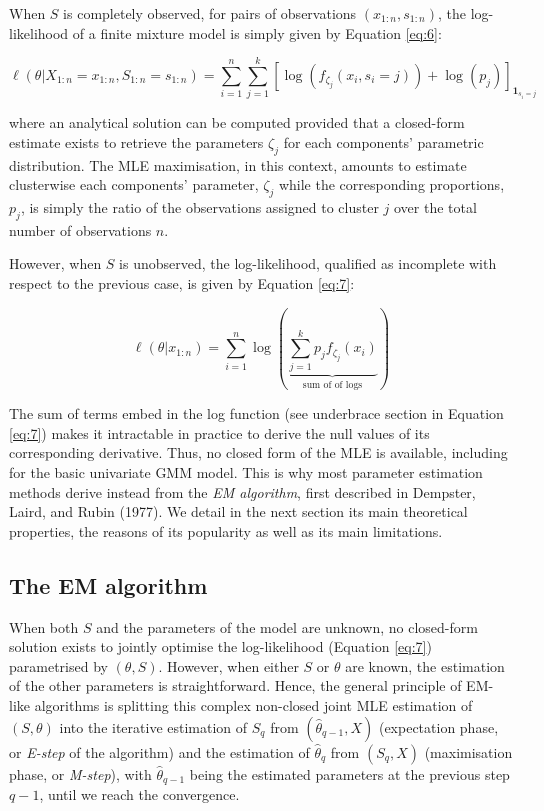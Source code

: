 When \(S\) is completely observed, for pairs of observations
\((x_{1:n}, s_{1:n})\), the log-likelihood of a finite mixture model is
simply given by Equation \eqref{eq:6}:

\begin{equation}
\ell(\theta|X_{1:n}=x_{1:n}, S_{1:n}=s_{1:n})=\sum_{i=1}^n \sum_{j=1}^k \left[\log\left(f_{\zeta_j} (x_i, s_i=j)\right) + \log(p_j) \right]_{\mathbf{1}_{s_i=j}}
\label{eq:6}
\end{equation}

where an analytical solution can be computed provided that a closed-form estimate exists to retrieve the parameters \(\zeta_j\) for each components' parametric distribution. The MLE maximisation, in this context, amounts to estimate clusterwise each components' parameter, \(\zeta_j\) while the corresponding proportions, \(p_j\), is simply the ratio of the observations assigned to cluster \(j\) over the total number of observations \(n\).

However, when \(S\) is unobserved, the log-likelihood, qualified as
incomplete with respect to the previous case, is given by Equation
\eqref{eq:7}:

\begin{equation}
\ell (\theta \vert x_{1:n}) = \sum_{i=1}^n  \log \left( \underbrace{\sum_{j=1}^k  p_j f_{\zeta_j}(x_i)}_{\text{sum of of logs}} \right)
\label{eq:7}
\end{equation}

The sum of terms embed in the log function (see underbrace section in Equation \eqref{eq:7}) makes it intractable in practice to derive the null values of its corresponding derivative. Thus, no closed form of the MLE is available,
including for the basic univariate GMM model. This is why most
parameter estimation methods derive instead from the \emph{EM algorithm},
first described in Dempster, Laird, and Rubin (1977). We detail in the next section its
main theoretical properties, the reasons of its popularity as well as
its main limitations.

\hypertarget{the-em-algorithm}{%
\subsection{The EM algorithm}\label{the-em-algorithm}}

When both \(S\) and the parameters of the model are unknown, no closed-form solution exists to jointly optimise the log-likelihood (Equation \eqref{eq:7}) parametrised by \(({\theta}, S)\).
However, when either \(S\) or \(\theta\) are known, the estimation of the
other parameters is straightforward. Hence, the general principle of
EM-like algorithms is splitting this complex non-closed joint MLE
estimation of \((S, \theta)\) into the iterative estimation of \(S_q\) from
\((\hat{\theta}_{q-1}, X)\) (expectation phase, or \emph{E-step} of the algorithm)
and the estimation of \(\hat{\theta}_{q}\) from \((S_q, X)\) (maximisation phase, or
\emph{M-step}), with \(\hat{\theta}_{q-1}\) being the estimated parameters at the
previous step \(q-1\), until we reach the convergence.

